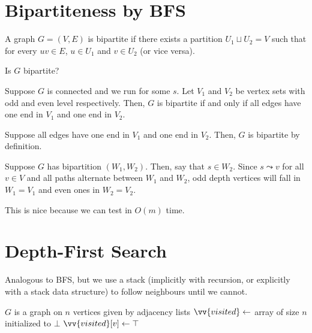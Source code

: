 \section{Bipartiteness by BFS}

\begin{defn}[bipartite]
  A graph $G = (V, E)$ is bipartite
  if there exists a partition $U_1 \sqcup U_2 = V$
  such that for every $uv \in E$, $u \in U_1$ and $v \in U_2$ (or vice versa).
\end{defn}

\begin{problem}
  Is $G$ bipartite?
\end{problem}

\begin{lemma}
  Suppose $G$ is connected and we run  for some $s$.
  Let $V_1$ and $V_2$ be vertex sets with odd and even level respectively.
  Then, $G$ is bipartite if and only if all edges have one end in $V_1$ and one end in $V_2$.
\end{lemma}
\begin{prf}
  Suppose all edges have one end in $V_1$ and one end in $V_2$.
  Then, $G$ is bipartite by definition.

  Suppose $G$ has bipartition $(W_1, W_2)$.
  Then, \Wlog say that $s \in W_2$.
  Since $s \leadsto v$ for all $v \in V$ and all paths alternate between $W_1$ and $W_2$,
  odd depth vertices will fall in $W_1 = V_1$ and even ones in $W_2 = V_2$.
\end{prf}

This is nice because we can test in $O(m)$ time.

\section{Depth-First Search}

Analogous to BFS, but we use a stack (implicitly with recursion,
or explicitly with a stack data structure) to follow neighbours until we cannot.

\begin{algorithm}[H]
  \caption{}
  \begin{algorithmic}[1]
    \Require $G$ is a graph on $n$ vertices given by adjacency lists
    \State $\vv{visited} \gets$ array of size $n$ initialized to $\bot$
    \State $\vv{visited}[v] \gets \top$
    \State {}
    \EndIf
    \EndFor
    \EndProcedure
    \State {}
    \EndIf
    \EndFor
  \end{algorithmic}
\end{algorithm}

